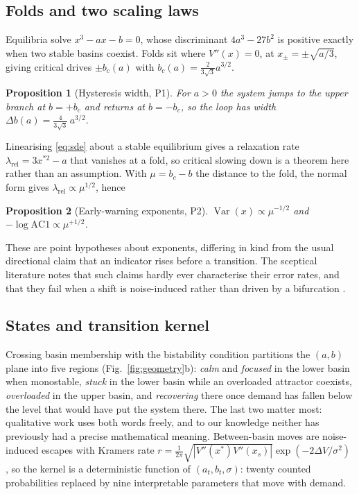 \documentclass[conference]{IEEEtran}
\newtheorem{proposition}{Proposition}
\DeclareMathOperator{\Var}{Var}
\begin{document}
\subsection{Folds and two scaling laws}
Equilibria solve $x^3-ax-b=0$, whose discriminant $4a^3-27b^2$ is positive
exactly when two stable basins coexist. Folds sit where $V''(x)=0$, at
$x_\pm=\pm\sqrt{a/3}$, giving critical drives $\pm b_c(a)$ with
$b_c(a)=\tfrac{2}{3\sqrt3}a^{3/2}$.

\begin{proposition}[Hysteresis width, P1]\label{prop:hyst}
For $a>0$ the system jumps to the upper branch at $b=+b_c$ and returns at
$b=-b_c$, so the loop has width
$\Delta b(a)=\tfrac{4}{3\sqrt3}\,a^{3/2}$.
\end{proposition}

Linearising \eqref{eq:sde} about a stable equilibrium gives a relaxation rate
$\lambda_{\text{rel}}=3x^{*2}-a$ that vanishes at a fold, so critical slowing
down is a theorem here rather than an assumption. With $\mu=b_c-b$ the distance
to the fold, the normal form gives $\lambda_{\text{rel}}\propto\mu^{1/2}$, hence

\begin{proposition}[Early-warning exponents, P2]\label{prop:ews}
$\Var(x)\propto\mu^{-1/2}$ and $-\log\mathrm{AC1}\propto\mu^{+1/2}$.
\end{proposition}

These are point hypotheses about exponents, differing in kind from the usual
directional claim that an indicator rises before a transition. The sceptical
literature notes that such claims hardly ever characterise their error rates,
and that they fail when a shift is noise-induced rather than driven by a
bifurcation \cite{ditlevsen2010,boettiger2012}.

\subsection{States and transition kernel}
Crossing basin membership with the bistability condition partitions the $(a,b)$
plane into five regions (Fig.~\ref{fig:geometry}b): \emph{calm} and
\emph{focused} in the lower basin when monostable, \emph{stuck} in the lower
basin while an overloaded attractor coexists, \emph{overloaded} in the upper
basin, and \emph{recovering} there once demand has fallen below the level that
would have put the system there. The last two matter most: qualitative work uses
both words freely, and to our knowledge neither has previously had a precise
mathematical meaning. Between-basin moves are noise-induced escapes with Kramers
rate
$r=\tfrac{1}{2\pi}\sqrt{|V''(x^*)V''(x_s)|}\exp(-2\Delta V/\sigma^2)$
\cite{kramers1940}, so the kernel is a deterministic function of
$(a_t,b_t,\sigma)$: twenty counted probabilities replaced by nine interpretable
parameters that move with demand.
\end{document}
